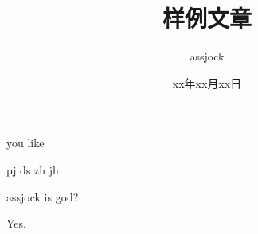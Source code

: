 \documentclass[addpoints,answers]{exam}
\title{样例文章}
\author{assjock}
\date{xx年xx月xx日}
\begin{document}
\begin{questions}
\question[50]you like\\
\begin{oneparchoices}
\correctchoice pj
\choice ds
\choice zh
\choice jh
\end{oneparchoices}

\question[50]assjock is god?
\begin{soluton}
Yes.
\end{soluton}

\end{questions}
\end{document}
